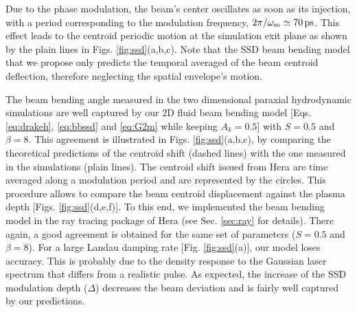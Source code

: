 \documentclass[%
 reprint,
 amsmath,amssymb,
 aps,
]{revtex4-1}
\begin{document}
Due to the phase modulation, the beam's center oscillates as soon as its injection, with a period corresponding to the modulation frequency, $2\pi/\omega_m\simeq 70\,\rm ps$. This effect leads to the centroid periodic motion at the simulation exit plane as shown by the  plain lines in Figs.  \ref{fig:ssd}(a,b,c). Note that the SSD beam bending model that we propose only predicts the temporal averaged of the beam centroid deflection, therefore neglecting the spatial envelope's motion.

The beam bending angle measured in the two dimensional paraxial hydrodynamic simulations are well captured by our 2D fluid beam bending model [Eqs. \eqref{eq:drakeh}, \eqref{eq:bbssd}  and \eqref{eq:G2m} while keeping $A_k=0.5$] with $S= 0.5$ and $\beta=8$. This agreement is illustrated in Figs.  \ref{fig:ssd}(a,b,c), by comparing the theoretical predictions of the centroid shift (dashed lines) with the one measured in the simulations (plain lines). The centroid shift issued from Hera are time averaged along a modulation period and are represented by the  circles. This procedure allows to compare the beam centroid displacement against the plasma depth [Figs. \ref{fig:ssd}(d,e,f)]. To this end, we implemented the beam bending model in the ray tracing package of Hera (see Sec. \ref{sec:ray} for details). 
There again, a good agreement is obtained for the same set of parameters ($S= 0.5$ and $\beta=8$). 
For a large Landau damping rate [Fig. \ref{fig:ssd}(a)], our model loses accuracy. This is probably due to the density response to the  Gaussian  laser spectrum that differs from a realistic pulse.
As expected, the increase of the  SSD modulation depth ($\Delta$) %
decreases the beam deviation and is fairly well captured by our predictions. 
\end{document}
